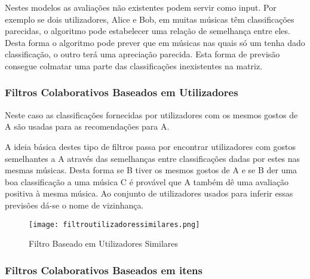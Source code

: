 \par Nestes modelos as avaliações não existentes podem servir como input. Por exemplo se dois utilizadores, Alice e Bob, em muitas músicas têm classificações parecidas, o algoritmo pode estabelecer uma relação de semelhança entre eles. Desta forma o algoritmo pode prever que em músicas nas quais só um tenha dado classificação, o outro terá uma apreciação parecida. Esta forma de previsão consegue colmatar uma parte das classificações inexistentes na matriz.







\hfill

\subsubsection{ Filtros Colaborativos Baseados em Utilizadores}

\hfill

 \par Neste caso as classificações fornecidas por utilizadores com os mesmos gostos de A são usadas para as recomendações para A. 

 \par A ideia básica destes tipo de filtros passa por encontrar utilizadores com gostos semelhantes a A através das semelhanças entre classificações dadas por estes nas mesmas músicas. Desta forma se B tiver os mesmos gostos de A e se B der uma boa classificação a uma música C é provável que A também dê uma avaliação positiva à mesma música. Ao conjunto de utilizadores usados para inferir essas previsões dá-se o nome de vizinhança.


\hfill

\begin{figure}[H]

  \centering

  \texttt{[image: filtroutilizadoressimilares.png]}

  \caption {Filtro Baseado em Utilizadores Similares}

  \label {fig01}

\end{figure}



\subsubsection{ Filtros Colaborativos Baseados em itens}

